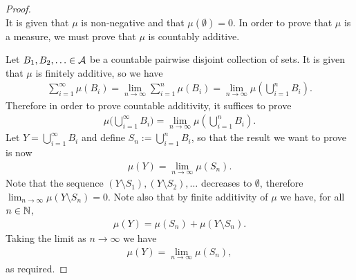 \begin{proof}~\\
  It is given that $\mu$ is non-negative and that $\mu(\emptyset) = 0$. In order to prove that $\mu$ is a
  measure, we must prove that $\mu$ is countably additive.

  Let $B_1, B_2, \ldots \in \mathcal A$ be a countable pairwise disjoint collection of sets. It is given that $\mu$
  is finitely additive, so we have
  \begin{align*}
    \sum_{i=1}^\infty \mu(B_i) = \lim_{n\to\infty} \sum_{i=1}^n \mu(B_i) = \lim_{n\to\infty} \mu(\bigcup_{i=1}^n B_i).
  \end{align*}
  Therefore in order to prove countable additivity, it suffices to prove
  \begin{align*}
    \mu\big(\bigcup_{i=1}^\infty B_i \big) = \lim_{n\to\infty} \mu(\bigcup_{i=1}^n B_i).
  \end{align*}
  Let $Y = \bigcup_{i=1}^\infty B_i$ and define $S_n := \bigcup_{i=1}^n B_i$, so that the result we want to
  prove is now
  \begin{align*}
    \mu(Y) = \lim_{n\to\infty} \mu(S_n).
  \end{align*}
  Note that the sequence $(Y \setminus S_1), (Y \setminus S_2), \ldots$ decreases to $\emptyset$,
  therefore $\lim_{n\to\infty}\mu(Y \setminus S_n) = 0$. Note also that by finite additivity of $\mu$ we have,
  for all $n \in \mathbb{N}$,
  \begin{align*}
    \mu(Y) = \mu(S_n) + \mu(Y \setminus S_n).
  \end{align*}
  Taking the limit as $n \to \infty$ we have
  \begin{align*}
    \mu(Y) = \lim_{n\to\infty} \mu(S_n),
  \end{align*}
  as required.
\end{proof}


